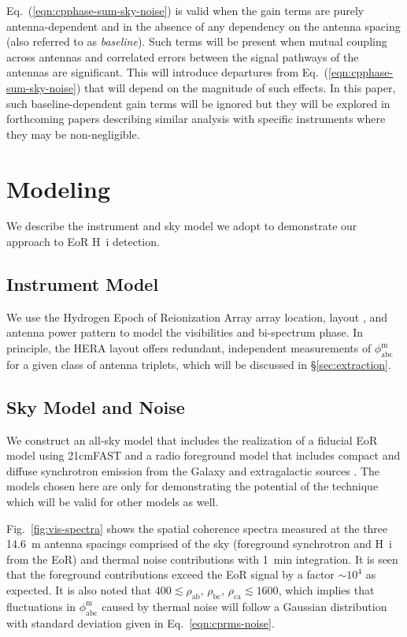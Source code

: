 \documentclass[
reprint,
superscriptaddress,
amsmath,
amssymb,
aps,
]{revtex4-1}
\begin{document}
Eq.~(\ref{eqn:cpphase-sum-sky-noise}) is valid when the gain terms are purely antenna-dependent and in the absence of any dependency on the antenna spacing (also referred to as {\it baseline}). Such terms will be present when mutual coupling across antennas and correlated errors between the signal pathways of the antennas are significant. This will introduce departures from Eq.~(\ref{eqn:cpphase-sum-sky-noise}) that will depend on the magnitude of such effects. In this paper, such baseline-dependent gain terms will be ignored but they will be explored in forthcoming papers describing similar analysis with specific instruments where they may be non-negligible. 

\section{Modeling}\label{sec:modeling}

We describe the instrument and sky model we adopt to demonstrate our approach to EoR H~{\sc i} detection. 

\subsection{Instrument Model}\label{sec:instrument}

We use the Hydrogen Epoch of Reionization Array \cite[HERA;][]{deb17,thy16,ewa16,neb16,patra17} array location, layout \cite{dil16}, and antenna power pattern \cite{deb17} to model the visibilities and bi-spectrum phase. In principle, the HERA layout offers redundant, independent measurements of $\phi_\textrm{abc}^\textrm{m}$ for a given class of antenna triplets, which will be discussed in \S\ref{sec:extraction}.

\subsection{Sky Model and Noise}\label{sec:skymodel-noise}

We construct an all-sky model that includes the realization of a fiducial EoR model using 21cmFAST \cite{mes11} and a radio foreground model that includes compact and diffuse synchrotron emission from the Galaxy and extragalactic sources \cite{thy15a}. The models chosen here are only for demonstrating the potential of the technique which will be valid for other models as well.

Fig.~\ref{fig:vis-spectra} shows the spatial coherence spectra measured at the three 14.6~m antenna spacings comprised of the sky (foreground synchrotron and H~{\sc i} from the EoR) and thermal noise contributions with 1~min integration. It is seen that the foreground contributions exceed the EoR signal by a factor $\sim 10^4$ as expected. It is also noted that $400\lesssim \rho_\textrm{ab},\,\rho_\textrm{bc},\,\rho_\textrm{ca} \lesssim 1600$, which implies that fluctuations in $\phi_\textrm{abc}^\textrm{m}$ caused by thermal noise will follow a Gaussian distribution with standard deviation given in Eq.~\ref{eqn:cprms-noise}.
\end{document}

